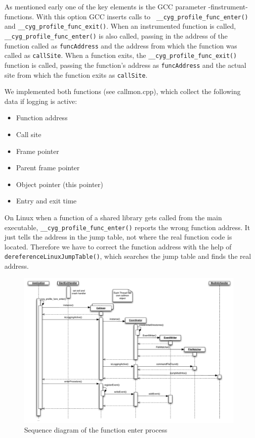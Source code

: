 As mentioned early one of the key elements is the GCC parameter -finstrument-functions. With this option GCC inserts calls to \verb= __cyg_profile_func_enter()= and \verb=__cyg_profile_func_exit()=. When an instrumented function is called, \verb= __cyg_profile_func_enter()= is also called, passing in the address of the function called as \verb=funcAddress= and the address from which the function was called as \verb=callSite=. When a function exits, the \verb=__cyg_profile_func_exit()= function is called, passing the function's address as \verb=funcAddress= and the actual site from which the function exits as \verb=callSite=.

We implemented both functions (see callmon.cpp), which collect the following data if logging is active:
\begin{itemize}
	\item Function address
	\item Call site
	\item Frame pointer
	\item Parent frame pointer
	\item Object pointer (this pointer)
	\item Entry and exit time
\end{itemize}

On Linux when a function of a shared library gets called from the main executable, \verb=__cyg_profile_func_enter()= reports the wrong function address. It just tells the address in the jump table, not where the real function code is located. Therefore we have to correct the function address with the help of \verb=dereferenceLinuxJumpTable()=, which searches the jump table and finds the real address.

\begin{figure}[ht]
\centering
\includegraphics[width=18cm]{images/callmon_sequence_diagram}
\caption{Sequence diagram of the function enter process}\label{fig:unixfe_figure2}
\end{figure}

